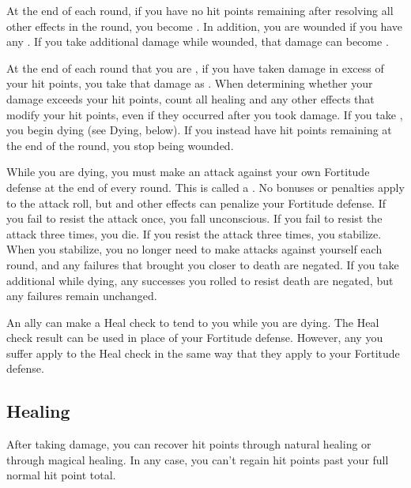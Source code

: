         \label{Wounded} At the end of each round, if you have no hit points remaining after resolving all other effects in the round, you become \wounded.
        In addition, you are wounded if you have any .
        If you take additional damage while wounded, that damage can become .

        At the end of each round that you are , if you have taken damage in excess of your hit points, you take that damage as .
        When determining whether your damage exceeds your hit points, count all healing and any other effects that modify your hit points, even if they occurred after you took damage.
        If you take , you begin dying (see Dying, below).
        If you instead have hit points remaining at the end of the round, you stop being wounded.

        \label{Dying} While you are dying, you must make an attack against your own Fortitude defense at the end of every round.
        This is called a .
        No bonuses or penalties apply to the attack roll, but  and other effects can penalize your Fortitude defense.
        If you fail to resist the attack once, you fall unconscious.
        If you fail to resist the attack three times, you die.
        If you resist the attack three times, you stabilize.
        When you stabilize, you no longer need to make attacks against yourself each round, and any failures that brought you closer to death are negated.
        If you take additional  while dying, any successes you rolled to resist death are negated, but any failures remain unchanged.

        An ally can make a Heal check to tend to you while you are dying.
        The Heal check result can be used in place of your Fortitude defense.
        However, any  you suffer apply to the Heal check in the same way that they apply to your Fortitude defense.

    \subsection{Healing}
        After taking damage, you can recover hit points through natural healing or through magical healing.
        In any case, you can't regain hit points past your full normal hit point total.

